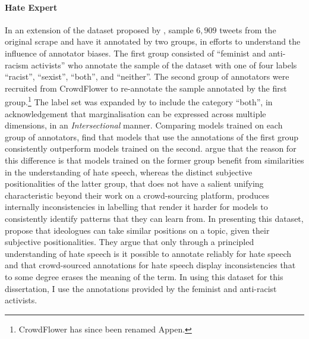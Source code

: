 \paragraph*{Hate Expert} In an extension of the dataset proposed by \citet{Waseem-Hovy:2016}, \citet{Waseem:2016} sample $6,909$ tweets from the original scrape and have it annotated by two groups, in efforts to understand the influence of annotator biases. The first group consisted of ``feminist and anti-racism activists'' \citep{Waseem:2016} who annotate the sample of the dataset with one of four labels ``racist'', ``sexist'', ``both'', and ``neither''. The second group of annotators were recruited from CrowdFlower to re-annotate the sample annotated by the first group.\footnote{CrowdFlower has since been renamed Appen.}
The label set was expanded by \citet{Waseem:2016} to include the category ``both'', in acknowledgement that marginalisation can be expressed across multiple dimensions, in an \textit{Intersectional} manner. Comparing models trained on each group of annotators, \citet{Waseem:2016} find that models that use the annotations of the first group consistently outperform models trained on the second. \citet{Waseem:2016} argue that the reason for this difference is that models trained on the former group benefit from similarities in the understanding of hate speech, whereas the distinct subjective positionalities of the latter group, that does not have a salient unifying characteristic beyond their work on a crowd-sourcing platform, produces internally inconsistencies in labelling that render it harder for models to consistently identify patterns that they can learn from.
In presenting this dataset, \citet{Waseem:2016} propose that ideologues can take similar positions on a topic, given their subjective positionalities. They argue that only through a principled understanding of hate speech is it possible to annotate reliably for hate speech and that crowd-sourced annotations for hate speech display inconsistencies that to some degree erases the meaning of the term.
In using this dataset for this dissertation, I use the annotations provided by the feminist and anti-racist activists.

